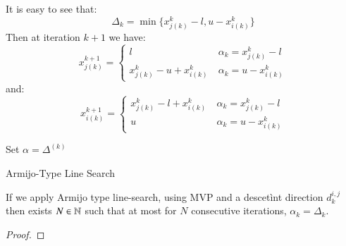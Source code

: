 It is easy to see that:
\begin{equation*}
\Delta_k=\min \{ x^k_{j(k)}-l, u-x^k_{i(k)}\}
\end{equation*}
Then at iteration $k+1$ we have:
\begin{equation*}
x^{k+1}_{j(k)}=\begin{cases}
 l \ &\alpha_k=x^k_{j(k)}-l\\
 x^k_{j(k)}-u+x^k_{i(k)} \ &\alpha_k=u-x^k_{i(k)}
 \end{cases}
\end{equation*}
and:
\begin{equation*}
x^{k+1}_{i(k)}=\begin{cases}
 x^k_{j(k)}-l+x^k_{i(k)} \ &\alpha_k=x^k_{j(k)}-l\\
 u \ &\alpha_k=u-x^k_{i(k)}
 \end{cases}
\end{equation*}


\begin{algorithm}
 Set $\alpha = \Delta^{(k)}$\\
 \caption{Armijo-Type Line Search}
\end{algorithm}

\begin{proposition}
 If we apply Armijo type line-search, using MVP and a descetìnt direction $d_k^{i,j}$ then exists $N \in \mathbb{N}$ such that at most for $N$ consecutive iterations, $\alpha_k=\Delta_k$.
\end{proposition}
\begin{proof}
\end{proof}

